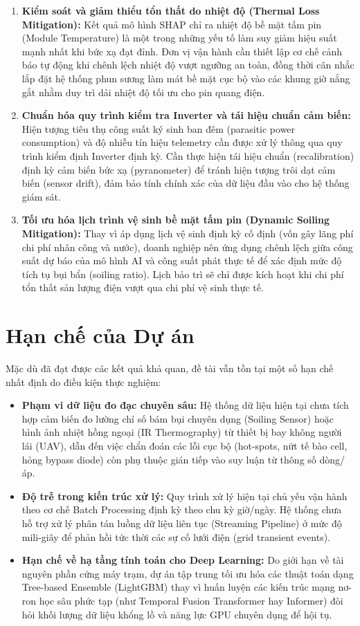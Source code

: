 \documentclass[12pt, a4paper]{report}
\begin{document}
\begin{enumerate}
    \item \textbf{Kiểm soát và giảm thiểu tổn thất do nhiệt độ (Thermal Loss Mitigation):} Kết quả mô hình SHAP chỉ ra nhiệt độ bề mặt tấm pin (Module Temperature) là một trong những yếu tố làm suy giảm hiệu suất mạnh nhất khi bức xạ đạt đỉnh. Đơn vị vận hành cần thiết lập cơ chế cảnh báo tự động khi chênh lệch nhiệt độ vượt ngưỡng an toàn, đồng thời cân nhắc lắp đặt hệ thống phun sương làm mát bề mặt cục bộ vào các khung giờ nắng gắt nhằm duy trì dải nhiệt độ tối ưu cho pin quang điện.
    \item \textbf{Chuẩn hóa quy trình kiểm tra Inverter và tái hiệu chuẩn cảm biến:} Hiện tượng tiêu thụ công suất ký sinh ban đêm (parasitic power consumption) và độ nhiễu tín hiệu telemetry cần được xử lý thông qua quy trình kiểm định Inverter định kỳ. Cần thực hiện tái hiệu chuẩn (recalibration) định kỳ cảm biến bức xạ (pyranometer) để tránh hiện tượng trôi dạt cảm biến (sensor drift), đảm bảo tính chính xác của dữ liệu đầu vào cho hệ thống giám sát.
    \item \textbf{Tối ưu hóa lịch trình vệ sinh bề mặt tấm pin (Dynamic Soiling Mitigation):} Thay vì áp dụng lịch vệ sinh định kỳ cố định (vốn gây lãng phí chi phí nhân công và nước), doanh nghiệp nên ứng dụng chênh lệch giữa công suất dự báo của mô hình AI và công suất phát thực tế để xác định mức độ tích tụ bụi bẩn (soiling ratio). Lịch bảo trì sẽ chỉ được kích hoạt khi chi phí tổn thất sản lượng điện vượt qua chi phí vệ sinh thực tế.
\end{enumerate}

\section{Hạn chế của Dự án}
\label{sec:limitations}
Mặc dù đã đạt được các kết quả khả quan, đề tài vẫn tồn tại một số hạn chế nhất định do điều kiện thực nghiệm:

\begin{itemize}
    \item \textbf{Phạm vi dữ liệu đo đạc chuyên sâu:} Hệ thống dữ liệu hiện tại chưa tích hợp cảm biến đo lường chỉ số bám bụi chuyên dụng (Soiling Sensor) hoặc hình ảnh nhiệt hồng ngoại (IR Thermography) từ thiết bị bay không người lái (UAV), dẫn đến việc chẩn đoán các lỗi cục bộ (hot-spots, nứt tế bào cell, hỏng bypass diode) còn phụ thuộc gián tiếp vào suy luận từ thông số dòng/áp.
    \item \textbf{Độ trễ trong kiến trúc xử lý:} Quy trình xử lý hiện tại chủ yếu vận hành theo cơ chế Batch Processing định kỳ theo chu kỳ giờ/ngày. Hệ thống chưa hỗ trợ xử lý phân tán luồng dữ liệu liên tục (Streaming Pipeline) ở mức độ mili-giây để phản hồi tức thời các sự cố lưới điện (grid transient events).
    \item \textbf{Hạn chế về hạ tầng tính toán cho Deep Learning:} Do giới hạn về tài nguyên phần cứng máy trạm, dự án tập trung tối ưu hóa các thuật toán dạng Tree-based Ensemble (LightGBM) thay vì huấn luyện các kiến trúc mạng nơ-ron học sâu phức tạp (như Temporal Fusion Transformer hay Informer) đòi hỏi khối lượng dữ liệu khổng lồ và năng lực GPU chuyên dụng để hội tụ.
\end{itemize}
\end{document}
